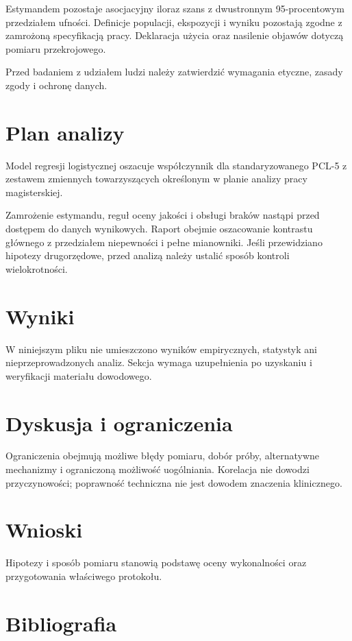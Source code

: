 \documentclass[11pt,a4paper]{article}
\begin{document}
Estymandem pozostaje asocjacyjny iloraz szans z dwustronnym 95-procentowym przedziałem ufności. Definicje populacji, ekspozycji i wyniku pozostają zgodne z zamrożoną specyfikacją pracy. Deklaracja użycia oraz nasilenie objawów dotyczą pomiaru przekrojowego.

Przed badaniem z udziałem ludzi należy zatwierdzić wymagania etyczne, zasady zgody i ochronę danych.

\section{Plan analizy}

Model regresji logistycznej oszacuje współczynnik dla standaryzowanego PCL-5 z zestawem zmiennych towarzyszących określonym w planie analizy pracy magisterskiej.

Zamrożenie estymandu, reguł oceny jakości i obsługi braków nastąpi przed dostępem do danych wynikowych. Raport obejmie oszacowanie kontrastu głównego z przedziałem niepewności i pełne mianowniki. Jeśli przewidziano hipotezy drugorzędowe, przed analizą należy ustalić sposób kontroli wielokrotności.

\section{Wyniki}

W niniejszym pliku nie umieszczono wyników empirycznych, statystyk ani nieprzeprowadzonych analiz. Sekcja wymaga uzupełnienia po uzyskaniu i weryfikacji materiału dowodowego.

\section{Dyskusja i ograniczenia}

Ograniczenia obejmują możliwe błędy pomiaru, dobór próby, alternatywne mechanizmy i ograniczoną możliwość uogólniania. Korelacja nie dowodzi przyczynowości; poprawność techniczna nie jest dowodem znaczenia klinicznego.

\section{Wnioski}

Hipotezy i sposób pomiaru stanowią podstawę oceny wykonalności oraz przygotowania właściwego protokołu.

\section*{Bibliografia}
\end{document}

